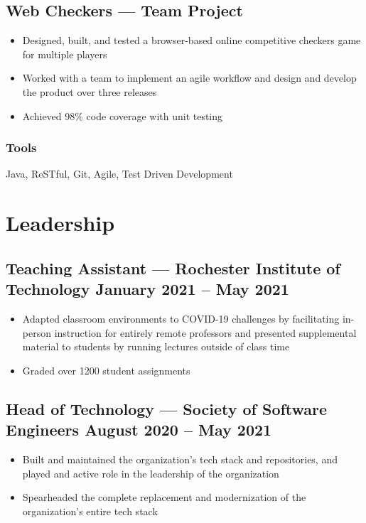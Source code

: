 \documentclass[11pt, letterpaper]{article}
\begin{document}
        \subsection{Web Checkers --- Team Project}
            \begin{itemize}[nosep]
                \item Designed, built, and tested a browser-based online competitive checkers game for multiple 
                    players
                \item Worked with a team to implement an agile workflow and design and develop the product 
                    over three releases
                \item Achieved 98\% code coverage with unit testing
            \end{itemize}
            \subsubsection{Tools}
                Java, ReSTful, Git, Agile, Test Driven Development

    \section{Leadership}
        \subsection{Teaching Assistant --- Rochester Institute of Technology \hfill January 2021 -- May 2021}
            \begin{itemize}[nosep]
                \item Adapted classroom environments to COVID-19 challenges by facilitating in-person
                    instruction for entirely remote professors and presented supplemental material to 
                    students by running lectures outside of class time
                \item Graded over 1200 student assignments
            \end{itemize}

        \subsection{Head of Technology --- Society of Software Engineers \hfill August 2020 -- May 2021}
            \begin{itemize}[nosep]
                \item Built and maintained the organization's tech stack and repositories, and played and active 
                    role in the leadership of the organization
                \item Spearheaded the complete replacement and modernization of the organization's entire tech 
                    stack
            \end{itemize}
\end{document}
